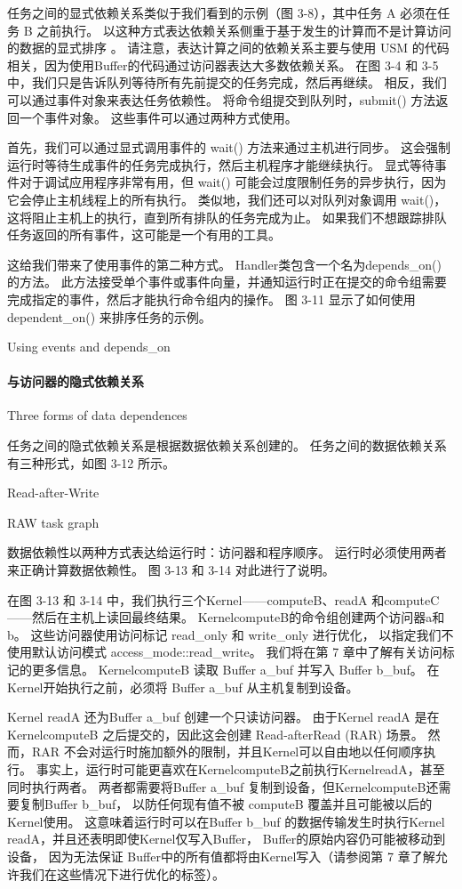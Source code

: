 任务之间的显式依赖关系类似于我们看到的示例（图 3-8），其中任务 A 必须在任务 B 之前执行。
以这种方式表达依赖关系侧重于基于发生的计算而不是计算访问的数据的显式排序 。 
请注意，表达计算之间的依赖关系主要与使用 USM 的代码相关，因为使用Buffer的代码通过访问器表达大多数依赖关系。 
在图 3-4 和 3-5 中，我们只是告诉队列等待所有先前提交的任务完成，然后再继续。 
相反，我们可以通过事件对象来表达任务依赖性。 将命令组提交到队列时，submit() 方法返回一个事件对象。 
这些事件可以通过两种方式使用。

首先，我们可以通过显式调用事件的 wait() 方法来通过主机进行同步。 
这会强制运行时等待生成事件的任务完成执行，然后主机程序才能继续执行。 
显式等待事件对于调试应用程序非常有用，但 wait() 可能会过度限制任务的异步执行，因为它会停止主机线程上的所有执行。 
类似地，我们还可以对队列对象调用 wait()，这将阻止主机上的执行，直到所有排队的任务完成为止。 
如果我们不想跟踪排队任务返回的所有事件，这可能是一个有用的工具。

这给我们带来了使用事件的第二种方式。 Handler类包含一个名为depends\_on() 的方法。 
此方法接受单个事件或事件向量，并通知运行时正在提交的命令组需要完成指定的事件，然后才能执行命令组内的操作。 
图 3-11 显示了如何使用 dependent\_on() 来排序任务的示例。

{\color{red} Using events and depends\_on}

\paragraph{与访问器的隐式依赖关系}

{\color{red} Three forms of data dependences}

任务之间的隐式依赖关系是根据数据依赖关系创建的。 任务之间的数据依赖关系有三种形式，如图 3-12 所示。

{\color{red} Read-after-Write}

{\color{red} RAW task graph}

数据依赖性以两种方式表达给运行时：访问器和程序顺序。 运行时必须使用两者来正确计算数据依赖性。 
图 3-13 和 3-14 对此进行了说明。

在图 3-13 和 3-14 中，我们执行三个Kernel——computeB、readA 和computeC——然后在主机上读回最终结果。 
KernelcomputeB的命令组创建两个访问器a和b。 这些访问器使用访问标记 read\_only 和 write\_only 进行优化，
以指定我们不使用默认访问模式 access\_mode::read\_write。 我们将在第 7 章中了解有关访问标记的更多信息。
KernelcomputeB 读取 Buffer a\_buf 并写入 Buffer b\_buf。 
在Kernel开始执行之前，必须将 Buffer a\_buf 从主机复制到设备。

Kernel readA 还为Buffer a\_buf 创建一个只读访问器。 
由于Kernel readA 是在KernelcomputeB 之后提交的，因此这会创建 Read-afterRead (RAR) 场景。 
然而，RAR 不会对运行时施加额外的限制，并且Kernel可以自由地以任何顺序执行。 
事实上，运行时可能更喜欢在KernelcomputeB之前执行KernelreadA，甚至同时执行两者。 
两者都需要将Buffer a\_buf 复制到设备，但KernelcomputeB还需要复制Buffer b\_buf，
以防任何现有值不被 computeB 覆盖并且可能被以后的Kernel使用。 
这意味着运行时可以在Buffer b\_buf 的数据传输发生时执行Kernel readA，并且还表明即使Kernel仅写入Buffer，
Buffer的原始内容仍可能被移动到设备，
因为无法保证 Buffer中的所有值都将由Kernel写入（请参阅第 7 章了解允许我们在这些情况下进行优化的标签）。

